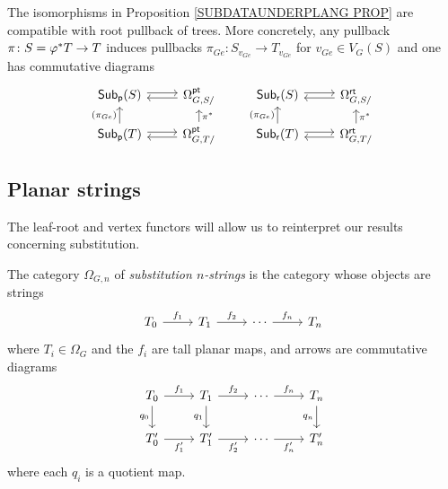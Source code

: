 \documentclass[a4paper,10pt]{article}%
\begin{document}
\begin{remark}\label{PULLCOMP REM}
  The isomorphisms in Proposition \ref{SUBDATAUNDERPLANG PROP}
  are compatible with root pullback of trees. More concretely, any pullback $\pi \colon S=\varphi^{\**} T \to T$ induces pullbacks 
  $\pi_{Ge}\colon S_{v_{Ge}} \to T_{v_{Ge}}$ for $v_{Ge} \in V_G(S)$ and one has commutative diagrams
  \begin{equation}\label{SUBDATAUNDERPLANG2 EQ}
    \begin{tikzcd}[row sep =10pt]
      \mathsf{Sub}_{\mathsf{p}}(S) \ar[r,shift left=2pt] &
      \Omega_{G,S/}^{\mathsf{pt}} \ar[l,shift left=2pt] &
      \mathsf{Sub}_{\mathsf{r}}(S) \ar[r,shift left=2pt] &
      \Omega_{G,S/}^{\mathsf{rt}} \ar[l,shift left=2pt]
      \\
      \mathsf{Sub}_{\mathsf{p}}(T) \ar[r,shift left=2pt] \ar{u}{(\pi_{Ge})} &
      \Omega_{G,T/}^{\mathsf{pt}} \ar[l,shift left=2pt] \ar{u}[swap]{\pi^{\**}} &
      \mathsf{Sub}_{\mathsf{r}}(T) \ar[r,shift left=2pt] \ar{u}{(\pi_{Ge})} &
      \Omega_{G,T/}^{\mathsf{rt}} \ar[l,shift left=2pt] \ar{u}[swap]{\pi^{\**}}
    \end{tikzcd}
  \end{equation}
\end{remark}



\subsection{Planar strings}\label{PLANARSTRING SEC}

The leaf-root and vertex functors will allow us to reinterpret our results concerning substitution.

\begin{definition}
  The category $\Omega_{G,n}$ of 
  \textit{substitution $n$-strings} is the category whose objects are strings
  \[
  \begin{tikzcd}
    T_0 \ar{r}{f_1} & T_1 \ar{r}{f_2} & \cdots \ar{r}{f_n} & T_n
  \end{tikzcd}	
  \]
  where $T_i \in \Omega_G$ and the $f_i$ are tall planar maps, and arrows are commutative diagrams 
  \begin{equation} \label{PTNARROW EQ}
    \begin{tikzcd}
      T_0 \ar{r}{f_1} \ar{d}[swap]{q_0} & T_1 \ar{r}{f_2} \ar{d}[swap]{q_1} & \cdots \ar{r}{f_n} & T_n \ar{d}[swap]{q_n}
      \\
      T'_0 \ar{r}[swap]{f'_1} & T'_1 \ar{r}[swap]{f'_2} & \cdots \ar{r}[swap]{f'_n} & T'_n
    \end{tikzcd}	
  \end{equation}
  where each $q_i$ is a quotient map.
\end{definition}
\end{document}
